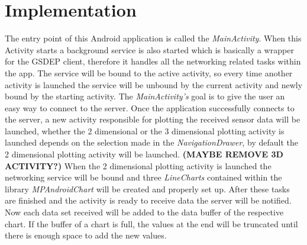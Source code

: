 \section{Implementation}
The entry point of this Android application is called the \emph{MainActivity}. When this Activity starts a background service is also started which is basically a wrapper for the GSDEP client, therefore it handles all the networking related tasks within the app. The service will be bound to the active activity, so every time another activity is launched the service will be unbound by the current activity and newly bound by the starting activity. The \emph{MainActivity's} goal is to give the user an easy way to connect to the server. Once the application successfully connects to the server, a new activity responsible for plotting the received sensor data will be launched, whether the 2 dimensional or the 3 dimensional plotting activity is launched depends on the selection made in the \emph{NavigationDrawer}, by default the 2 dimensional plotting activity will be launched. {\color{red} \textbf{(MAYBE REMOVE 3D ACTIVITY?)}} When the 2 dimensional plotting activity is launched the networking service will be bound and three \emph{LineCharts} contained within the library \emph{MPAndroidChart} will be created and properly set up. After these tasks are finished and the activity is ready to receive data the server will be notified. Now each data set received will be added to the data buffer of the respective chart. If the buffer of a chart is full, the values at the end will be truncated until there is enough space to add the new values.

